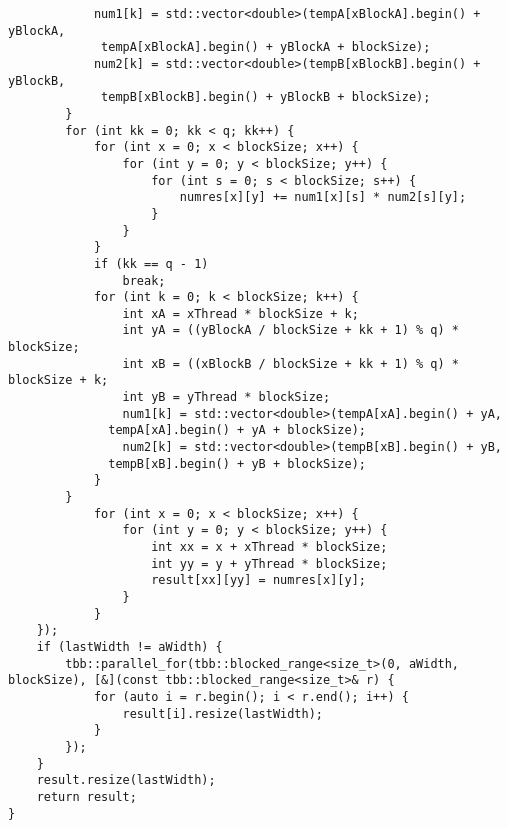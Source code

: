\documentclass{report}
\begin{document}
\begin{lstlisting}
            num1[k] = std::vector<double>(tempA[xBlockA].begin() + yBlockA,
             tempA[xBlockA].begin() + yBlockA + blockSize);
            num2[k] = std::vector<double>(tempB[xBlockB].begin() + yBlockB,
             tempB[xBlockB].begin() + yBlockB + blockSize);
        }
        for (int kk = 0; kk < q; kk++) {
            for (int x = 0; x < blockSize; x++) {
                for (int y = 0; y < blockSize; y++) {
                    for (int s = 0; s < blockSize; s++) {
                        numres[x][y] += num1[x][s] * num2[s][y];
                    }
                }
            }
            if (kk == q - 1)
                break;
            for (int k = 0; k < blockSize; k++) {
                int xA = xThread * blockSize + k;
                int yA = ((yBlockA / blockSize + kk + 1) % q) * blockSize;
                int xB = ((xBlockB / blockSize + kk + 1) % q) * blockSize + k;
                int yB = yThread * blockSize;
                num1[k] = std::vector<double>(tempA[xA].begin() + yA,
              tempA[xA].begin() + yA + blockSize);
                num2[k] = std::vector<double>(tempB[xB].begin() + yB,
              tempB[xB].begin() + yB + blockSize);
            }
        }
            for (int x = 0; x < blockSize; x++) {
                for (int y = 0; y < blockSize; y++) {
                    int xx = x + xThread * blockSize;
                    int yy = y + yThread * blockSize;
                    result[xx][yy] = numres[x][y];
                }
            }
    });
    if (lastWidth != aWidth) {
        tbb::parallel_for(tbb::blocked_range<size_t>(0, aWidth, blockSize), [&](const tbb::blocked_range<size_t>& r) {
            for (auto i = r.begin(); i < r.end(); i++) {
                result[i].resize(lastWidth);
            }
        });
    }
    result.resize(lastWidth);
    return result;
}

\end{lstlisting}
\end{document}
